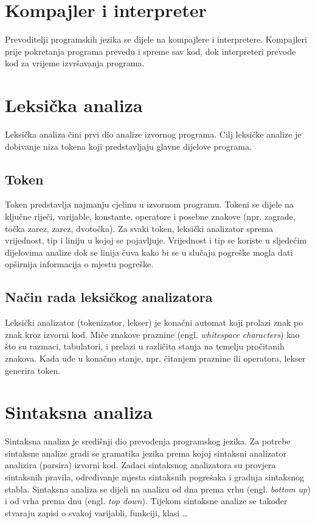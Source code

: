 \documentclass[times, utf8, zavrsni]{fer}
\begin{document}
\section{Kompajler i interpreter}
Prevoditelji programskih jezika se dijele na kompajlere i interpretere. Kompajleri prije pokretanja programa prevedu i spreme sav kod, dok interpreteri 
prevode kod za vrijeme izvršavanja programa. \citep{compilerint}

\section{Leksička analiza}
Leksička analiza čini prvi dio analize izvornog programa. Cilj leksičke analize je dobivanje niza tokena koji predstavljaju glavne dijelove programa. \citep{ppj}

\subsection{Token}
Token predstavlja najmanju cjelinu u izvornom programu. Tokeni se dijele na ključne riječi, varijable, konstante, operatore i posebne znakove (npr. zagrade, točka zarez, zarez, dvotočka).
Za svaki token, leksički analizator sprema vrijednost, tip i liniju u kojoj se pojavljuje. Vrijednost i tip se koriste u sljedećim dijelovima analize dok se linija čuva kako bi se u slučaju pogreške mogla
dati opširnija informacija o mjestu pogreške.

\subsection{Način rada leksičkog analizatora}
Leksički analizator (tokenizator, lekser) je konačni automat koji prolazi znak po znak kroz izvorni kod. Miče znakove praznine (engl. \textit{whitespace characters}) kao što su razmaci,
tabulatori, i prelazi u različita stanja na temelju pročitanih znakova.
Kada uđe u konačno stanje, npr. čitanjem praznine ili operatora, lekser generira token. \citep{ppj}

\section{Sintaksna analiza}
Sintaksna analiza je središnji dio prevođenja programskog jezika. Za potrebe sintaksne analize gradi se gramatika jezika prema kojoj sintaksni analizator analizira (parsira) izvorni kod.
Zadaci sintaksnog analizatora su provjera sintaksnih pravila, određivanje mjesta sintaksnih pogrešaka i gradnja sintaksnog stabla. \citep{ppj} Sintaksna analiza se dijeli na analizu od dna prema vrhu (engl. \textit{bottom up}) i od vrha prema dnu (engl. \textit{top down}). Tijekom sintaksne analize se također stvaraju zapisi o svakoj varijabli, funkciji, klasi \dots
\end{document}

